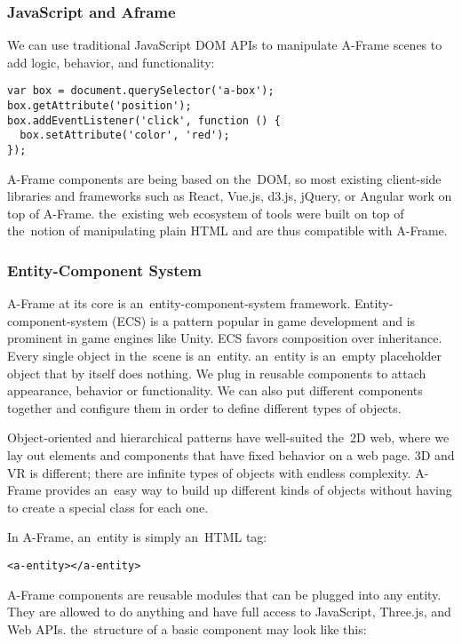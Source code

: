 \subsubsection{JavaScript and Aframe}
We can use traditional JavaScript DOM APIs to manipulate A-Frame scenes to add logic, behavior, and functionality:

\begin{lstlisting}
var box = document.querySelector('a-box');
box.getAttribute('position');
box.addEventListener('click', function () {
  box.setAttribute('color', 'red');
});
\end{lstlisting}

A-Frame components are being based on the~DOM, so most existing client-side libraries and frameworks such as React, Vue.js, d3.js, jQuery, or Angular work on top of A-Frame. the~existing web ecosystem of tools were built on top of the~notion of manipulating plain HTML and are thus compatible with A-Frame. \cite{aframe-intro}

\subsubsection{Entity-Component System}
A-Frame at its core is an~entity-component-system framework. Entity-component-system (ECS) is a pattern popular in game development and is prominent in game engines like Unity. ECS favors composition over inheritance. Every single object in the~scene is an~entity. an~entity is an~empty placeholder object that by itself does nothing. We plug in reusable components to attach appearance, behavior or functionality. We can also put different components together and configure them in order to define different types of objects. \cite{aframe-intro}

Object-oriented and hierarchical patterns have well-suited the~2D web, where we lay out elements and components that have fixed behavior on a web page. 3D and VR is different; there are infinite types of objects with endless complexity. A-Frame provides an~easy way to build up different kinds of objects without having to create a special class for each one. \cite{aframe-intro}

In A-Frame, an~entity is simply an~HTML tag:

\begin{lstlisting}
<a-entity></a-entity>
\end{lstlisting}

A-Frame components are reusable modules that can be plugged into any entity. They are allowed to do anything and have full access to JavaScript, Three.js, and Web APIs. the~structure of a basic component may look like this:

